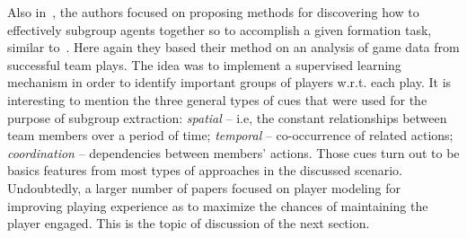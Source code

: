 Also in~\cite{laviersa_using_2014}, the authors focused on proposing methods for discovering how to effectively  subgroup agents together so to accomplish a given formation task, similar to~\cite{stone_task_1999}. Here again they based their method on an analysis of game data from successful team plays. The idea was to implement a supervised learning mechanism in order to identify important groups of players w.r.t. each play. It is interesting to mention the three general types of cues that were used for the purpose of subgroup extraction: \textit{spatial} -- i.e, the constant relationships between team members over a period of time; \textit{temporal} -- co-occurrence of related actions; \textit{coordination} -- dependencies between members' actions. Those cues turn out to be basics features from most types of approaches in the discussed scenario. Undoubtedly, a larger number of papers focused on player modeling for improving playing experience as to maximize the chances of maintaining the player engaged. This is the topic of discussion of the next section.


